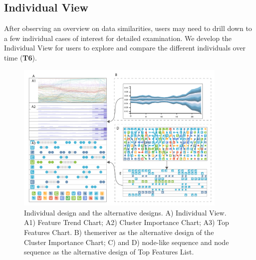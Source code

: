 \subsection{Individual View}
After observing an overview on data similarities, users may need to drill down to a few individual cases of interest for detailed examination.
We develop the Individual View for users to explore and compare the different individuals over time (\textbf{T6}).


\begin{figure}[t]
	\centering
    \includegraphics[width=0.90\textwidth]{figure/MultiRNNExplorer/design/alternative_design.pdf}
	\vspace{-3mm}
	\caption{Individual design and the alternative designs. A) Individual View. A1) Feature Trend Chart; A2) Cluster Importance Chart; A3) Top Features Chart. B) themeriver as the alternative design of the Cluster Importance Chart; C) and D) node-like sequence and node sequence as the alternative design of Top Features List.}
	\label{fig:individual_view}
	\vspace{-4mm}
\end{figure}


